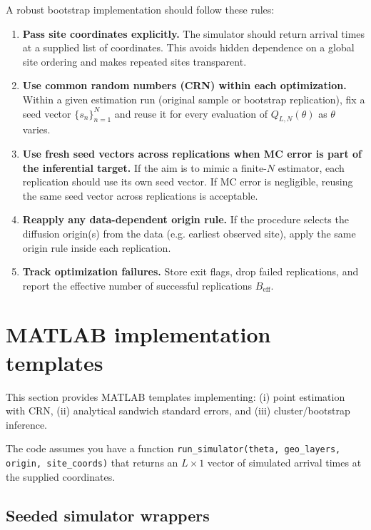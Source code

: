 \documentclass[11pt]{article}
\begin{document}
A robust bootstrap implementation should follow these rules:
\begin{enumerate}
  \item \textbf{Pass site coordinates explicitly.} The simulator should return
        arrival times at a supplied list of coordinates. This avoids hidden
        dependence on a global site ordering and makes repeated sites transparent.

  \item \textbf{Use common random numbers (CRN) within each optimization.}
        Within a given estimation run (original sample or bootstrap replication),
        fix a seed vector $\{s_n\}_{n=1}^{N}$ and reuse it for every evaluation
        of $Q_{L,N}(\theta)$ as $\theta$ varies.

  \item \textbf{Use fresh seed vectors across replications when MC error is part of
        the inferential target.} If the aim is to mimic a finite-$N$ estimator,
        each replication should use its own seed vector. If MC error is negligible,
        reusing the same seed vector across replications is acceptable.

  \item \textbf{Reapply any data-dependent origin rule.} If the procedure selects
        the diffusion origin(s) from the data (e.g. earliest observed site), apply
        the same origin rule inside each replication.

  \item \textbf{Track optimization failures.} Store exit flags, drop failed
        replications, and report the effective number of successful replications
        $B_{\mathrm{eff}}$.
\end{enumerate}

\section{MATLAB implementation templates}

This section provides MATLAB templates implementing:
(i) point estimation with CRN, (ii) analytical sandwich standard errors,
and (iii) cluster/bootstrap inference.

The code assumes you have a function
\texttt{run\_simulator(theta, geo\_layers, origin, site\_coords)}
that returns an $L\times 1$ vector of simulated arrival times at the supplied
coordinates.

\subsection{Seeded simulator wrappers}
\end{document}
